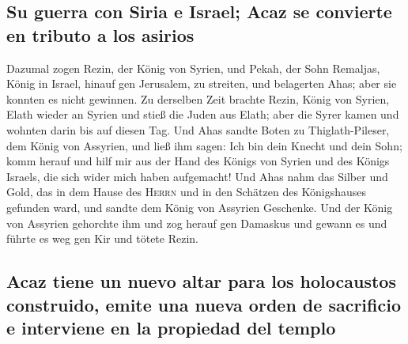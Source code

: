 \hypertarget{su-guerra-con-siria-e-israel-acaz-se-convierte-en-tributo-a-los-asirios}{%
\subsection{Su guerra con Siria e Israel; Acaz se convierte en tributo a
los
asirios}\label{su-guerra-con-siria-e-israel-acaz-se-convierte-en-tributo-a-los-asirios}}

 Dazumal zogen Rezin, der König von Syrien, und Pekah, der
Sohn Remaljas, König in Israel, hinauf gen Jerusalem, zu streiten, und
belagerten Ahas; aber sie konnten es nicht gewinnen.  Zu
derselben Zeit brachte Rezin, König von Syrien, Elath wieder an Syrien
und stieß die Juden aus Elath; aber die Syrer kamen und wohnten darin
bis auf diesen Tag.  Und Ahas sandte Boten zu
Thiglath-Pileser, dem König von Assyrien, und ließ ihm sagen: Ich bin
dein Knecht und dein Sohn; komm herauf und hilf mir aus der Hand des
Königs von Syrien und des Königs Israels, die sich wider mich haben
aufgemacht!  Und Ahas nahm das Silber und Gold, das in dem
Hause des \textsc{Herrn} und in den Schätzen des Königshauses gefunden
ward, und sandte dem König von Assyrien Geschenke.  Und
der König von Assyrien gehorchte ihm und zog herauf gen Damaskus und
gewann es und führte es weg gen Kir und tötete Rezin.

\hypertarget{acaz-tiene-un-nuevo-altar-para-los-holocaustos-construido-emite-una-nueva-orden-de-sacrificio-e-interviene-en-la-propiedad-del-templo}{%
\subsection{Acaz tiene un nuevo altar para los holocaustos construido,
emite una nueva orden de sacrificio e interviene en la propiedad del
templo}\label{acaz-tiene-un-nuevo-altar-para-los-holocaustos-construido-emite-una-nueva-orden-de-sacrificio-e-interviene-en-la-propiedad-del-templo}}

